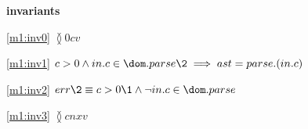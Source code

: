 \textbf{invariants}
\begin{block}
\item[ \eqref{m1:inv0} ]{$\between{0}{c}{v} $} %
\item[ \eqref{m1:inv1} ]{$c > 0 \land in.c \in \dom.parse  %
            \2\implies ast = parse.(in.c) $} %
\item[ \eqref{m1:inv2} ]{$err \2\equiv c > 0  %
            \1\land \neg in.c \in \dom.parse $} %
\item[ \eqref{m1:inv3} ]{$\between{c}{nx}{v} $} %
\end{block}
